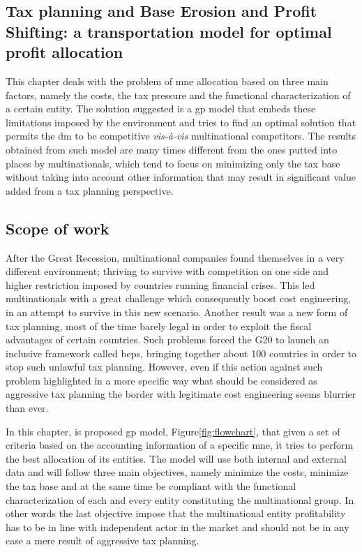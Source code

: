\begin{doublespace}
\chapter{Tax planning and Base Erosion and Profit Shifting: a transportation model for optimal profit allocation}
This chapter deals with the problem of \gls{mne} allocation based on three main factors, namely the costs, the tax pressure and the functional characterization of a certain entity. The solution suggested is a \gls{gp} model that embeds these limitations imposed by the environment and tries to find an optimal solution that permits the \gls{dm} to be competitive \textit{vis-à-vis} multinational competitors. The results obtained from such model are many times different from the ones putted into places by multinationals, which tend to focus on minimizing only the tax base without taking into account other information that may result in significant value added from a tax planning perspective. 

\section{Scope of work}
After the Great Recession, multinational companies found themselves in a very different environment; thriving to survive with competition on one side and higher restriction imposed by countries running financial crises. This led multinationals with a great challenge which consequently boost cost engineering, in an attempt to survive in this new scenario. Another result was a new form of tax planning, most of the time barely legal in order to exploit the fiscal advantages of certain countries\cite{After_tax_hedging_report_2013}. Such problems forced the G20 to launch an inclusive framework called \gls{beps}, bringing together about 100 countries in order to stop such unlawful tax planning. However, even if this action against such problem highlighted in a more specific way what should be considered as aggressive tax planning the border with legitimate cost engineering seems blurrier than ever\cite{Feller2017}.

In this chapter, is proposed \gls{gp} model, Figure\ref{fig:flowchart}, that given a set of criteria based on the accounting information of a specific \gls{mne}, it tries to perform the best allocation of its entities. The model will use both internal and external data and will follow three main objectives, namely minimize the costs, minimize the tax base and at the same time be compliant with the functional characterization of each and every entity constituting the multinational group. In other words the last objective impose that the multinational entity profitability has to be in line with independent actor in the market\cite{Model_Tax_Convention_2015} and should not be in any case a mere result of aggressive tax planning.


\end{doublespace}
